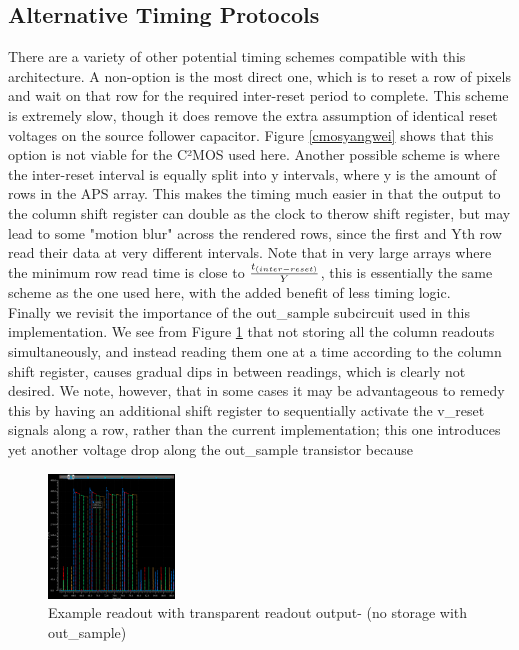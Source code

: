 \documentclass[lettersize,journal]{IEEEtran}
\begin{document}
\subsection{Alternative Timing Protocols}
There are a variety of other potential timing schemes compatible with this architecture. A non-option is the most direct one, which is to reset a row of pixels and wait on that row for the required inter-reset period to complete.
This scheme is extremely slow, though it does remove the extra assumption of identical reset voltages on the source follower capacitor. Figure \ref{cmosyangwei} shows that this option is not viable for the C²MOS used here.
Another possible scheme is where the inter-reset interval is equally split into y intervals, where y is the amount of rows in the APS array.
This makes the timing much easier in that the output to the column shift register can double as the clock to therow shift register, but may lead to some "motion blur" across the rendered rows, since the first and Yth row read their data at very different intervals.
Note that in very large arrays where the minimum row read time is close to $\frac{t_{\text(inter-reset)}}{Y}$, this is essentially the same scheme as the one used here, with the added benefit of less timing logic.\\

Finally we revisit the importance of the out\_sample subcircuit used in this implementation. We see from Figure \ref{nooutsample} that not storing all the column readouts simultaneously, and instead reading them one at a time according to the column shift register, causes gradual dips in between readings, which is clearly not desired.
We note, however, that in some cases it may be advantageous to remedy this by having an additional shift register to sequentially activate the v\_reset signals along a row, rather than the current implementation; this one introduces yet another voltage drop along the out\_sample transistor because 
\begin{figure}[h]
	\centering
	\includegraphics[width =0.3\textwidth]{nooutsample.png}
	\caption{Example readout with transparent readout output- (no storage with out\_sample)}
	\label{nooutsample}
\end{figure}
\end{document}
